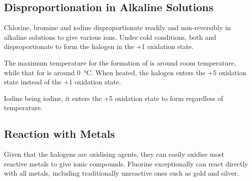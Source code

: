 		\subsection{Disproportionation in Alkaline Solutions}

			Chlorine, bromine and iodine disproportionate readily and non-reversibly in alkaline solutions to give various ions.
			Under cold conditions, both  and  disproportionate to form the halogen in the +1 oxidation state.


			The maximum temperature for the formation of  is around room temperature, while that for  is around
			\SI{0}{\celsius}. When heated, the halogen enters the +5 oxidation state instead of the +1 oxidation state.



			Iodine being iodine, it enters the +5 oxidation state to form  regardless of temperature.







		\subsection{Reaction with Metals}

			Given that the halogens are oxidising agents, they can easily oxidise most reactive metals to give ionic compounds. Fluorine
			exceptionally can react directly with all metals, including traditionally unreactive ones such as gold and silver.

